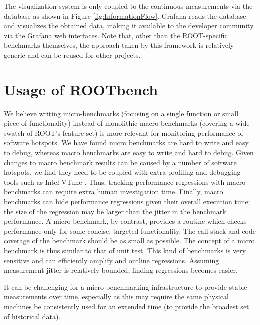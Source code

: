 \documentclass{webofc}
\begin{document}
The visualization system is only coupled to the continuous measurements via the database as shown in Figure \ref{fig:InformationFlow}. Grafana reads the database and visualizes the obtained data, making it available to the developer community via the Grafana web interfaces. Note that, other than the ROOT-specific benchmarks themselves, the approach taken by this framework is relatively generic and can be reused for other projects.




\section {Usage of ROOTbench} \label{sec:usage}

We believe writing micro-benchmarks (focusing on a single function or small piece of functionality) instead of monolithic macro benchmarks (covering a wide swatch of ROOT's feature set) is more relevant for monitoring performance of software hotspots. We have found micro benchmarks are hard to write and easy to debug, whereas macro benchmarks are easy to write and hard to debug. Given changes to macro benchmark results can be caused by a number of software hotspots, we find they need to be coupled with extra profiling and debugging tools such as Intel VTune \cite{vtune}. Thus, tracking performance regressions with macro benchmarks can require extra human investigation time. Finally, macro benchmarks can hide performance regressions given their overall execution time; the size of the regression may be larger than the jitter in the benchmark performance. A micro benchmark, by contrast, provides a routine which checks performance only for some concise, targeted functionality. The call stack and code coverage of the benchmark should be as small as possible. The concept of a micro benchmark is thus similar to that of unit test. This kind of benchmarks is very sensitive and can efficiently amplify and outline regressions. Assuming measurement jitter is relatively bounded, finding regressions becomes easier.

It can be challenging for a micro-benchmarking infrastructure to provide stable measurements over time, especially as this may require the same physical machines be consistently used for an extended time (to provide the broadest set of historical data).
\end{document}
